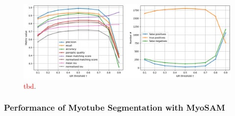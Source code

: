 \begin{figure}
	\centering
	\includegraphics[width=\textwidth]{"images/quantitative_performance_stardist.png"}
	\caption[Quantitative performance \texttt{Stardist}]{\textcolor{red}{tbd}.}
	\label{figperfstardist}
\end{figure} 


\subsubsection{Performance of Myotube Segmentation with MyoSAM}

